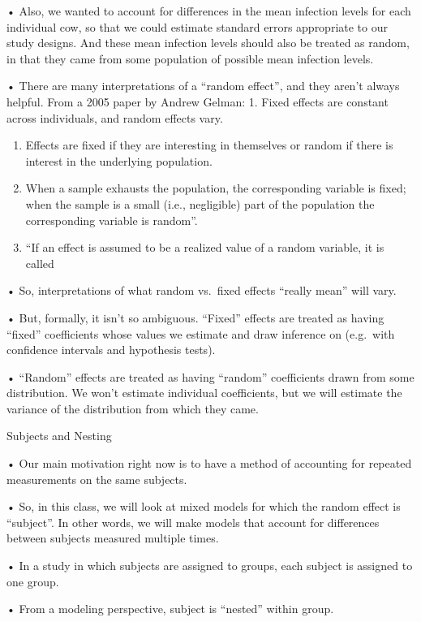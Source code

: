 \documentclass[
  letterpaper,
  DIV=11,
  numbers=noendperiod]{scrreprt}
\begin{document}
• Also, we wanted to account for differences in the mean infection
levels for each individual cow, so that we could estimate standard
errors appropriate to our study designs. And these mean infection levels
should also be treated as random, in that they came from some population
of possible mean infection levels.

• There are many interpretations of a ``random effect'', and they aren't
always helpful. From a 2005 paper by Andrew Gelman: 1. Fixed effects are
constant across individuals, and random effects vary.

\begin{enumerate}
\def\labelenumi{\arabic{enumi}.}
\setcounter{enumi}{1}
\item
  Effects are fixed if they are interesting in themselves or random if
  there is interest in the underlying population.
\item
  When a sample exhausts the population, the corresponding variable is
  fixed; when the sample is a small (i.e., negligible) part of the
  population the corresponding variable is random''.
\item
  ``If an effect is assumed to be a realized value of a random variable,
  it is called
\end{enumerate}

• So, interpretations of what random vs.~fixed effects ``really mean''
will vary.

• But, formally, it isn't so ambiguous. ``Fixed'' effects are treated as
having ``fixed'' coefficients whose values we estimate and draw
inference on (e.g.~with confidence intervals and hypothesis tests).

• ``Random'' effects are treated as having ``random'' coefficients drawn
from some distribution. We won't estimate individual coefficients, but
we will estimate the variance of the distribution from which they came.

Subjects and Nesting

• Our main motivation right now is to have a method of accounting for
repeated measurements on the same subjects.

• So, in this class, we will look at mixed models for which the random
effect is ``subject''. In other words, we will make models that account
for differences between subjects measured multiple times.

• In a study in which subjects are assigned to groups, each subject is
assigned to one group.

• From a modeling perspective, subject is ``nested'' within group.
\end{document}
